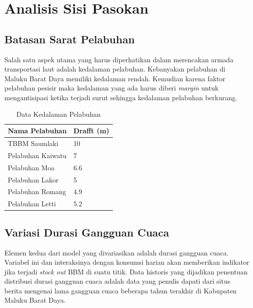 \section{Analisis Sisi Pasokan}
\label{sec:supply-side-analysis}

\subsection{Batasan Sarat Pelabuhan}
\label{subsec:batasan-sarat-pelabuhan}

Salah satu aspek utama yang harus diperhatikan dalam merencakan armada transportasi laut adalah kedalaman pelabuhan. Kebanyakan pelabuhan di Maluku Barat Daya memiliki kedalaman rendah. Kemudian karena faktor pelabuhan pesisir maka kedalaman yang ada harus diberi \emph{margin} untuk mengantisipasi ketika terjadi surut sehingga kedalaman pelabuhan berkurang.

\begin{table}[!htbp]
    \centering
    \caption{Data Kedalaman Pelabuhan}
    \begin{tabular}{|l|l|}
    \hline
        Nama Pelabuhan & Drafft (m) \\ \hline
        TBBM Saumlaki & 10 \\ \hline
        Pelabuhan Kaiwatu & 7 \\ \hline
        Pelabuhan Moa & 6.6 \\ \hline
        Pelabuhan Lakor & 5 \\ \hline
        Pelabuhan Romang & 4.9 \\ \hline
        Pelabuhan Letti & 5.2 \\ \hline
    \end{tabular}
    \label{tabel-draft-port}
\end{table}

\subsection{Variasi Durasi Gangguan Cuaca}
\label{subsec:variasi-Durasi-gangguan-cuaca}

Elemen kedua dari model yang divariasikan adalah durasi gangguan cuaca. Variabel ini dan interaksinya dengan konsumsi harian akan memberikan indikator jika terjadi \emph{stock out} BBM di suatu titik. Data historis yang dijadikan penentuan distribusi durasi gangguan cuaca adalah data yang penulis dapati dari situs berita mengenai lama gangguan cuaca beberapa tahun terakhir di Kabupaten Maluku Barat Daya.

